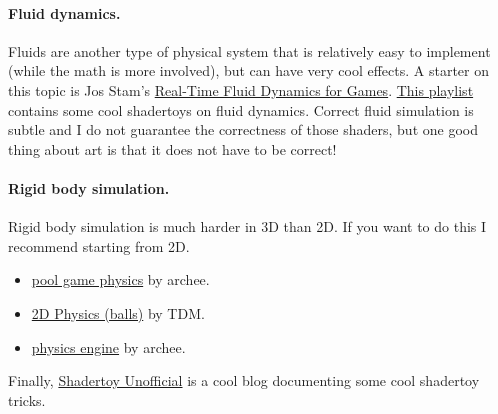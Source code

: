 \paragraph{Fluid dynamics.} Fluids are another type of physical system that is relatively easy to implement (while the math is more involved), but can have very cool effects. A starter on this topic is Jos Stam's \href{http://graphics.cs.cmu.edu/nsp/course/15-464/Fall09/papers/StamFluidforGames.pdf}{Real-Time Fluid Dynamics for Games}. \href{https://www.shadertoy.com/playlist/X3dXR8}{This playlist} contains some cool shadertoys on fluid dynamics. Correct fluid simulation is subtle and I do not guarantee the correctness of those shaders, but one good thing about art is that it does not have to be correct!

\paragraph{Rigid body simulation.} Rigid body simulation is much harder in 3D than 2D. If you want to do this I recommend starting from 2D.
\begin{itemize}
	\item \href{https://www.shadertoy.com/view/MljSz1}{pool game physics} by archee.
	\item \href{https://www.shadertoy.com/view/NtlGz7}{2D Physics (balls)} by TDM.
	\item \href{https://www.shadertoy.com/view/MdXBD8}{physics engine} by archee.
\end{itemize}

Finally, \href{https://shadertoyunofficial.wordpress.com/}{Shadertoy Unofficial} is a cool blog documenting some cool shadertoy tricks.

